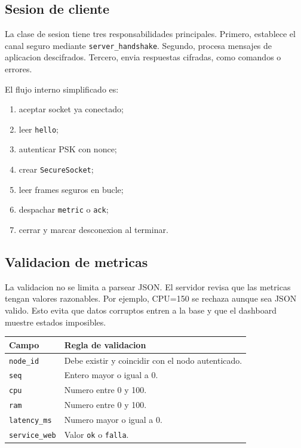 \documentclass[11pt,letterpaper]{article}
\begin{document}
\subsection{Sesion de cliente}

La clase de sesion tiene tres responsabilidades principales. Primero, establece
el canal seguro mediante \texttt{server\_handshake}. Segundo, procesa mensajes de
aplicacion descifrados. Tercero, envia respuestas cifradas, como comandos o
errores.

El flujo interno simplificado es:

\begin{enumerate}
  \item aceptar socket ya conectado;
  \item leer \texttt{hello};
  \item autenticar PSK con nonce;
  \item crear \texttt{SecureSocket};
  \item leer frames seguros en bucle;
  \item despachar \texttt{metric} o \texttt{ack};
  \item cerrar y marcar desconexion al terminar.
\end{enumerate}

\subsection{Validacion de metricas}

La validacion no se limita a parsear JSON. El servidor revisa que las metricas
tengan valores razonables. Por ejemplo, CPU=150 se rechaza aunque sea JSON valido.
Esto evita que datos corruptos entren a la base y que el dashboard muestre estados
imposibles.

\begin{longtable}{|p{}|p{}|}
\hline
\textbf{Campo} & \textbf{Regla de validacion} \\
\hline
\texttt{node\_id} & Debe existir y coincidir con el nodo autenticado. \\
\hline
\texttt{seq} & Entero mayor o igual a 0. \\
\hline
\texttt{cpu} & Numero entre 0 y 100. \\
\hline
\texttt{ram} & Numero entre 0 y 100. \\
\hline
\texttt{latency\_ms} & Numero mayor o igual a 0. \\
\hline
\texttt{service\_web} & Valor \texttt{ok} o \texttt{falla}. \\
\hline
\end{longtable}
\end{document}
